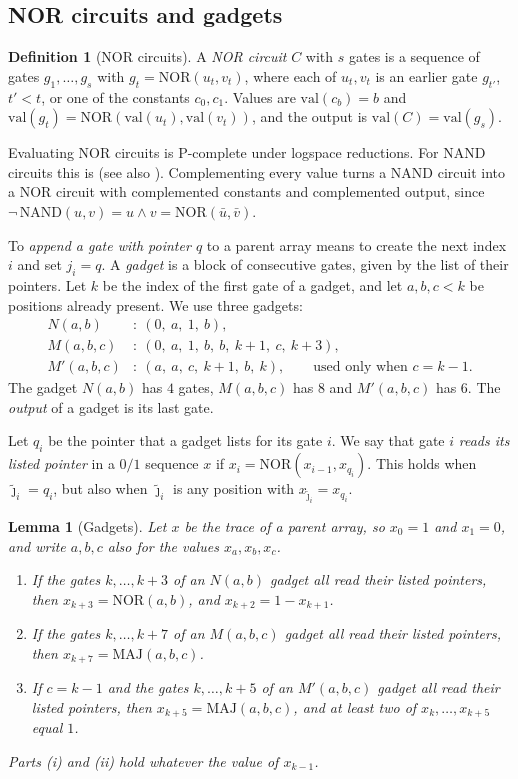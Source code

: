 \documentclass[11pt]{amsart}
\newtheorem{lemma}[theorem]{Lemma}
\theoremstyle{definition}
\newtheorem{definition}[theorem]{Definition}
\theoremstyle{remark}
\newcommand{\jt}{\tilde{\jmath}}
\newcommand{\NOR}{\mathrm{NOR}}
\newcommand{\MAJ}{\mathrm{MAJ}}
\newcommand{\val}{\mathrm{val}}
\begin{document}
\subsection{NOR circuits and gadgets}\label{gb:sec-gadgets}

\begin{definition}[NOR circuits]\label{gb:nor}
A \emph{NOR circuit} $C$ with $s$ gates is a sequence of gates
$g_1,\dots,g_s$ with $g_t=\NOR(u_t,v_t)$, where each of $u_t,v_t$ is an
earlier gate $g_{t'}$, $t'<t$, or one of the constants $c_0,c_1$. Values are
$\val(c_b)=b$ and $\val(g_t)=\NOR(\val(u_t),\val(v_t))$, and the output is
$\val(C)=\val(g_s)$.
\end{definition}

Evaluating NOR circuits is $\mathrm{P}$-complete under logspace reductions.
For NAND circuits this is \cite[Problem~A.1.5]{ghr} (see also
\cite{gb-ladner}). Complementing every value turns a NAND circuit into a NOR
circuit with complemented constants and complemented output, since
$\lnot\,\mathrm{NAND}(u,v)=u\wedge v=\NOR(\bar u,\bar v)$.

To \emph{append a gate with pointer $q$} to a parent array means to create
the next index $i$ and set $j_i=q$. A \emph{gadget} is a block of
consecutive gates, given by the list of their pointers. Let $k$ be the index
of the first gate of a gadget, and let $a,b,c<k$ be positions already
present. We use three gadgets:
\begin{align*}
N(a,b)&:\ (0,\ a,\ 1,\ b), \\
M(a,b,c)&:\ (0,\ a,\ 1,\ b,\ b,\ k+1,\ c,\ k+3), \\
M'(a,b,c)&:\ (a,\ a,\ c,\ k+1,\ b,\ k), \qquad\text{used only when } c=k-1.
\end{align*}
The gadget $N(a,b)$ has $4$ gates, $M(a,b,c)$ has $8$ and $M'(a,b,c)$ has
$6$. The \emph{output} of a gadget is its last gate.

Let $q_i$ be the pointer that a gadget lists for its gate $i$. We say that
gate $i$ \emph{reads its listed pointer} in a $0/1$ sequence $x$ if
$x_i=\NOR(x_{i-1},x_{q_i})$. This holds when $\jt_i=q_i$, but also when $\jt_i$ is any
position with $x_{\jt_i}=x_{q_i}$.

\begin{lemma}[Gadgets]\label{gb:gadgets}
Let $x$ be the trace of a parent array, so $x_0=1$ and $x_1=0$, and write
$a,b,c$ also for the values $x_a,x_b,x_c$.
\begin{enumerate}[label=(\roman*)]
\item If the gates $k,\dots,k+3$ of an $N(a,b)$ gadget all read their listed
pointers, then $x_{k+3}=\NOR(a,b)$, and $x_{k+2}=1-x_{k+1}$.
\item If the gates $k,\dots,k+7$ of an $M(a,b,c)$ gadget all read their
listed pointers, then $x_{k+7}=\MAJ(a,b,c)$.
\item If $c=k-1$ and the gates $k,\dots,k+5$ of an $M'(a,b,c)$ gadget all
read their listed pointers, then $x_{k+5}=\MAJ(a,b,c)$, and at least two of
$x_k,\dots,x_{k+5}$ equal $1$.
\end{enumerate}
Parts (i) and (ii) hold whatever the value of $x_{k-1}$.
\end{lemma}
\end{document}
